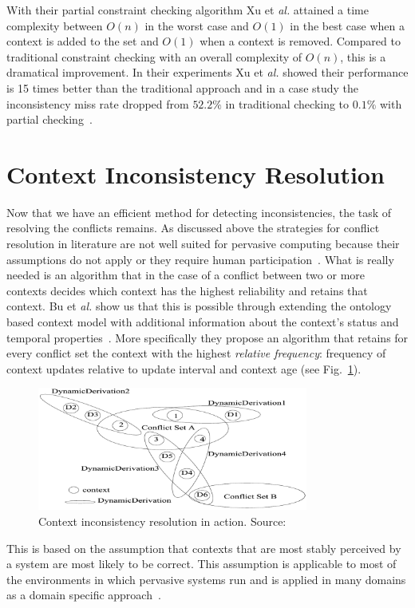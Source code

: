 \documentclass[journal]{vgtc}                %
\begin{document}
With their partial constraint checking algorithm Xu et \textit{al.} attained a time complexity between $O(n)$ in the worst case and $O(1)$ in the best case when a context is added to the set and $O(1)$ when a context is removed. Compared to traditional constraint checking with an overall complexity of $O(n)$, this is a dramatical improvement. In their experiments Xu et \textit{al.} showed their performance is 15 times better than the traditional approach and in a case study the inconsistency miss rate dropped from $52.2\%$ in traditional checking to $0.1\%$ with partial checking~\cite{xu:2010:PCC}.

\section{Context Inconsistency Resolution}
Now that we have an efficient method for detecting inconsistencies, the task of resolving the conflicts remains. As discussed above the strategies for conflict resolution in literature are not well suited for pervasive computing because their assumptions do not apply or they require human participation~\cite{xu:2010:PCC}. What is really needed is an algorithm that in the case of a conflict between two or more contexts decides which context has the highest reliability and retains that context. Bu et \textit{al.} show us that this is possible through extending the ontology based context model with additional information about the context's status and temporal properties~\cite{bu:2006:CCM}. More specifically they propose an algorithm that retains for every conflict set the context with the highest \textit{relative frequency}: frequency of context updates relative to update interval and context age (see Fig.~\ref{fig:cir}). 
\begin{figure}[htb]
  \centering
  \includegraphics[width=3.5in]{cir}
  \caption{Context inconsistency resolution in action. Source:~\cite{bu:2006:CCM}}
  \label{fig:cir}
\end{figure}
This is based on the assumption that contexts that are most stably perceived by a system are most likely to be correct. This assumption is applicable to most of the environments in which pervasive systems run and is applied in many domains as a domain specific approach~\cite{xu:2010:PCC}.
\end{document}
